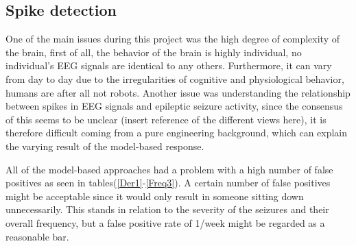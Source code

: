 



\subsection{Spike detection}
One of the main issues during this project was the high degree of complexity of the brain, first of all, the behavior of the brain is highly individual, no individual's EEG signals are identical to any others. Furthermore, it can vary from day to day due to the irregularities of cognitive and physiological behavior, humans are after all not robots. Another issue was understanding the relationship between spikes in EEG signals and epileptic seizure activity, since the consensus of this seems to be unclear (insert reference of the different views here), it is therefore difficult coming from a pure engineering background, which can explain the varying result of the model-based response.

All of the model-based approaches had a problem with a high number of false positives as seen in tables(\ref{Der1}-\ref{Freq3}). A certain number of false positives might be acceptable since it would only result in someone sitting down unnecessarily. This stands in relation to the severity of the seizures and their overall frequency, but a false positive rate of 1/week might be regarded as a reasonable bar. 

